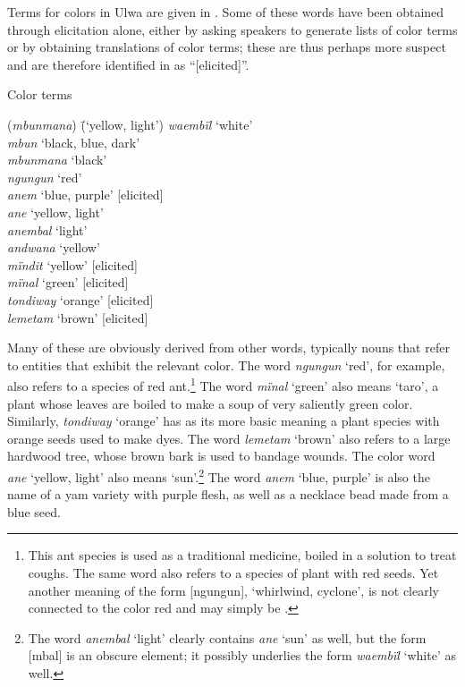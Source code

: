 Terms for colors in Ulwa are given in . Some of these words have been obtained through elicitation alone, either by asking speakers to generate lists of color terms or by obtaining translations of  color terms; these are thus perhaps more suspect and are therefore identified in  as “[elicited]”.

\newpage

\ea%
    \label{ex:sem:14}
          Color terms\\
    \begin{tabbing}
    {(\textit{mbunmana})} \= {(‘yellow, light’)}\kill
    \textit{waembïl}  \>  ‘white’\\
    \textit{mbun}   \>   ‘black, blue, dark’\\
    \textit{mbunmana} \> ‘black’\\
    \textit{ngungun}  \>  ‘red’\\
    \textit{anem}  \>  ‘blue, purple’ [elicited]\\
    \textit{ane}    \>    ‘yellow, light’\\
    \textit{anembal}  \>  ‘light’\\
    \textit{andwana}  \>  ‘yellow’\\
    \textit{mïndit}  \>  ‘yellow’ [elicited]\\
    \textit{mïnal}  \>  ‘green’ [elicited]\\
    \textit{tondiway} \> ‘orange’ [elicited]\\
    \textit{lemetam} \>   ‘brown’ [elicited]
    \end{tabbing}
\z

Many of these are obviously derived from other words, typically nouns that refer to entities that exhibit the relevant color. The word \textit{ngungun} ‘red’, for example, also refers to a species of red ant.\footnote{This ant species is used as a traditional medicine, boiled in a solution to treat coughs. The same word also refers to a species of plant with red seeds. Yet another meaning of the form [ngungun], ‘whirlwind, cyclone’, is not clearly connected to the color red and may simply be .} The word \textit{mïnal} ‘green’ also means ‘taro’, a plant whose leaves are boiled to make a soup of very saliently green color. Similarly, \textit{tondiway} ‘orange’ has as its more basic meaning a plant species with orange seeds used to make dyes. The word \textit{lemetam} ‘brown’ also refers to a large hardwood tree, whose brown bark is used to bandage wounds. The color word \textit{ane} ‘yellow, light’ also means ‘sun’.\footnote{The word \textit{anembal} ‘light’ clearly contains \textit{ane} ‘sun’ as well, but the form [mbal] is an obscure element; it possibly underlies the form \textit{waembïl} ‘white’ as well.} The word \textit{anem} ‘blue, purple’ is also the name of a yam variety with purple flesh, as well as a necklace bead made from a blue seed.

